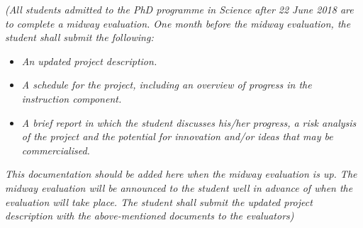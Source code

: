 %
%
\textit{(All students admitted to the PhD programme in Science after 22 June 2018 are to complete a midway evaluation. One month before the midway evaluation, the student shall submit the following:}

\begin{itemize}
    \item \textit{An updated project description.}
    \item \textit{A schedule for the project, including an overview of progress in the instruction component.}
    \item \textit{A brief report in which the student discusses his/her progress, a risk analysis of the project and the potential for innovation and/or ideas that may be commercialised.}
\end{itemize}

\textit{This documentation should be added here when the midway evaluation is up. The midway evaluation will be announced to the student well in advance of when the evaluation will take place. The student shall submit the updated project description with the above-mentioned documents to the evaluators)}